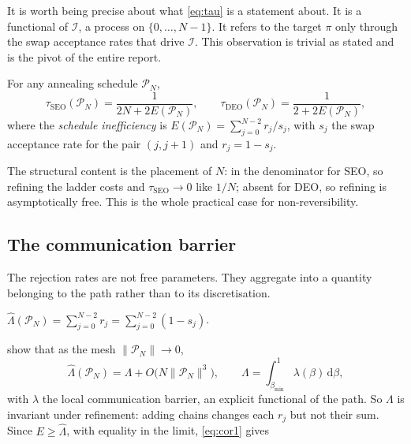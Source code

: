 It is worth being precise about what \eqref{eq:tau} is a statement about. It is a
functional of $\mathcal I$, a process on $\{0,\dots,N-1\}$. It refers to the
target $\pi$ only through the swap acceptance rates that drive $\mathcal I$. This
observation is trivial as stated and is the pivot of the entire report.

\begin{corollary}
\label{cor:syed1}
For any annealing schedule $\mathcal P_N$,
\begin{equation}
  \tau_{\mathrm{SEO}}(\mathcal P_N)=\frac{1}{2N+2E(\mathcal P_N)},
  \qquad
  \tau_{\mathrm{DEO}}(\mathcal P_N)=\frac{1}{2+2E(\mathcal P_N)},
  \label{eq:cor1}
\end{equation}
where the \emph{schedule inefficiency} is
$E(\mathcal P_N)=\sum_{j=0}^{N-2} r_j/s_j$, with $s_j$ the swap acceptance rate
for the pair $(j,j+1)$ and $r_j=1-s_j$.
\end{corollary}

The structural content is the placement of $N$: in the denominator for SEO, so
refining the ladder costs and $\tau_{\mathrm{SEO}}\to0$ like $1/N$; absent for
DEO, so refining is asymptotically free. This is the whole practical case for
non-reversibility.

\subsection{The communication barrier}

The rejection rates are not free parameters. They aggregate into a quantity
belonging to the path rather than to its discretisation.

\begin{definition}
\label{def:barrier}
$\displaystyle \hat\Lambda(\mathcal P_N)=\sum_{j=0}^{N-2}r_j
 =\sum_{j=0}^{N-2}(1-s_j)$.
\end{definition}

\citet{syed2022} show that as the mesh $\|\mathcal P_N\|\to0$,
\begin{equation}
  \hat\Lambda(\mathcal P_N)=\Lambda+O\!\big(N\|\mathcal P_N\|^3\big),
  \qquad
  \Lambda=\int_{\beta_{\min}}^{1}\lambda(\beta)\,\mathrm d\beta,
  \label{eq:barrierlimit}
\end{equation}
with $\lambda$ the local communication barrier, an explicit functional of the
path. So $\Lambda$ is invariant under refinement: adding chains changes each
$r_j$ but not their sum. Since $E\ge\hat\Lambda$, with equality in the limit,
\eqref{eq:cor1} gives

